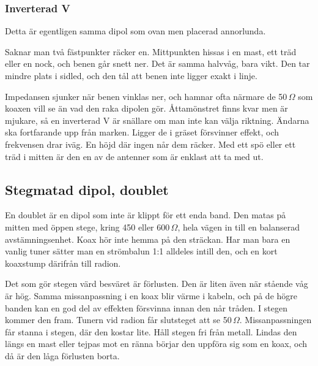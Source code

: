 \subsubsection{Inverterad V}

Detta är egentligen samma dipol som ovan men placerad annorlunda.

Saknar man två fästpunkter räcker en. Mittpunkten hissas i en mast, ett
träd eller en nock, och benen går snett ner. Det är samma halvvåg, bara
vikt. Den tar mindre plats i sidled, och den tål att benen inte ligger
exakt i linje.

Impedansen sjunker när benen vinklas ner, och hamnar ofta närmare de
50\,$\Omega$ som koaxen vill se än vad den raka dipolen gör. Åttamönstret
finns kvar men är mjukare, så en inverterad V är snällare om man inte
kan välja riktning. Ändarna ska fortfarande upp från marken. Ligger de i
gräset försvinner effekt, och frekvensen drar iväg. En höjd där ingen
når dem räcker. Med ett spö eller ett träd i mitten är den en av de
antenner som är enklast att ta med ut.

\subsection{Stegmatad dipol, doublet}

En doublet är en dipol som inte är klippt för ett enda band. Den matas
på mitten med öppen stege, kring 450 eller 600\,$\Omega$, hela vägen
in till en balanserad avstämningsenhet. Koax hör inte hemma på den
sträckan. Har man bara en vanlig tuner sätter man en strömbalun 1:1
alldeles intill den, och en kort koaxstump därifrån till radion.

Det som gör stegen värd besväret är förlusten. Den är liten även när
stående våg är hög. Samma missanpassning i en koax blir värme i
kabeln, och på de högre banden kan en god del av effekten försvinna
innan den når tråden. I stegen kommer den fram. Tunern vid radion får
slutsteget att se 50\,$\Omega$. Missanpassningen får stanna i stegen,
där den kostar lite. Håll stegen fri från metall. Lindas den längs en
mast eller tejpas mot en ränna börjar den uppföra sig som en koax, och
då är den låga förlusten borta.

